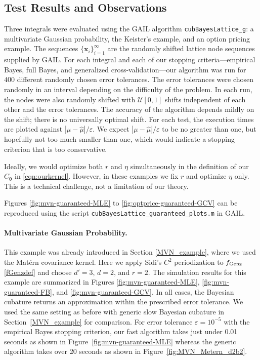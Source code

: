 \documentclass[twocolumn]{svjour3}          %
\newcommand{\bm}[1]{\boldsymbol{#1}}
\newcommand{\vtheta}{{\bm{\theta}}}
\newcommand{\vx}{\bm{x}}
\newcommand{\hmu}{\widehat{\mu}}
\newcommand{\code}[1]{\texttt{#1}}
\def\abs#1{\ensuremath{\left \lvert #1 \right \rvert}}
\newcommand\figref{Figure~\ref}
\newcommand\secref{Section~\ref}
\begin{document}
\subsection{Test Results and Observations}

Three integrals were evaluated using the GAIL algorithm \code{cubBayesLattice\_g}:  a multivariate Gaussian \linebreak[4] probability, the Keister's example, and an option pricing example.  
The sequences $\{\vx_i\}_{i=1}^\infty$ are the randomly shifted lattice node sequences supplied by GAIL. 
For each integral and each of our stopping criteria---empirical Bayes, full Bayes, and generalized cross-validation---our algorithm was run for $400$ different randomly chosen error tolerances. The error tolerances were chosen randomly in an interval depending on the difficulty of the problem. In each run, the nodes were also randomly shifted with $\mathcal{U}[0,1]$ shifts independent of each other and the error tolerances. The accuracy of the algorithm depends mildly on the shift; there is no universally optimal shift.
For each test, the execution times are plotted against $\abs{\mu - \hmu}/\varepsilon$.  We expect $\abs{\mu - \hmu}/\varepsilon$ to be no greater than one, but hopefully not too much smaller than one, which would indicate a stopping criterion that is too conservative. 

Ideally, we would optimize both $r$ and $\eta$ simultaneously in the definition of our $C_\vtheta$ in \eqref{eqn:ourkernel}.  However, in these examples we fix $r$ and optimize $\eta$ only.  This is a technical challenge, not a limitation of our theory.

Figures \ref{fig:mvn-guaranteed-MLE} to \ref{fig:optprice-guaranteed-GCV} can be reproduced using the script \code{cubBayesLattice\_guaranteed\_plots.m} in GAIL.


\paragraph{Multivariate Gaussian Probability.}

This example was already introduced in Section \ref{MVN_example}, where we used the Mat\'ern covariance kernel.  Here we apply Sidi's $C^2$  periodization to $ f_{\textup{Genz}}$ \eqref{fGenzdef} and choose $d'=3$, $d=2$, and $r=2$. The simulation results for this example are summarized in Figures \ref{fig:mvn-guaranteed-MLE}, \ref{fig:mvn-guaranteed-FB}, and \ref{fig:mvn-guaranteed-GCV}.  In all cases, the Bayesian cubature returns an approximation within the prescribed error tolerance. We used the same setting as before with generic slow Bayesian cubature in \secref{MVN_example} for comparison. For error tolerance $\varepsilon=10^{-5}$ with the empirical Bayes stopping criterion, our fast algorithm takes just under 0.01 seconds as shown in \figref{fig:mvn-guaranteed-MLE} whereas the generic algorithm takes over 20 seconds as shown in \figref{fig:MVN_Metern_d2b2}. 
\end{document}
